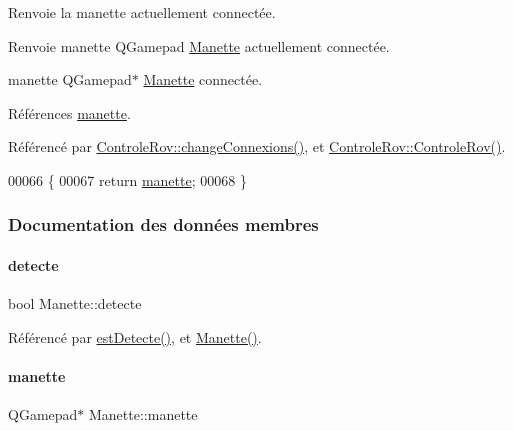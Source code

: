 Renvoie la manette actuellement connectée.

\begin{DoxyReturn}{Renvoie}
manette Q\+Gamepad \hyperlink{class_manette}{Manette} actuellement connectée.

manette Q\+Gamepad$\ast$ \hyperlink{class_manette}{Manette} connectée. 
\end{DoxyReturn}


Références \hyperlink{class_manette_adc9690756093748bb851d4c1d3ba82ea}{manette}.



Référencé par \hyperlink{class_controle_rov_a400d5766b9acabb45c1af5f8b22bbe47}{Controle\+Rov\+::change\+Connexions()}, et \hyperlink{class_controle_rov_acc4d5fea26770217df978d43df2ad51e}{Controle\+Rov\+::\+Controle\+Rov()}.


\begin{DoxyCode}
00066 \{
00067     \textcolor{keywordflow}{return} \hyperlink{class_manette_adc9690756093748bb851d4c1d3ba82ea}{manette};
00068 \}
\end{DoxyCode}


\subsubsection{Documentation des données membres}
\mbox{\label{class_manette_a2b9c2c380a7bce40d2c6353d534ba6a9}} 
\paragraph{\texorpdfstring{detecte}{detecte}}
{\footnotesize\ttfamily bool Manette\+::detecte\hspace{0.3cm}{\ttfamily [private]}}



Référencé par \hyperlink{class_manette_a035c0a43a11e91889891b3c874f0a58d}{est\+Detecte()}, et \hyperlink{class_manette_a9a7b00a30cd6a7eea503c8bcfe5bbcbb}{Manette()}.

\mbox{\label{class_manette_adc9690756093748bb851d4c1d3ba82ea}} 
\paragraph{\texorpdfstring{manette}{manette}}
{\footnotesize\ttfamily Q\+Gamepad$\ast$ Manette\+::manette\hspace{0.3cm}{\ttfamily [private]}}



